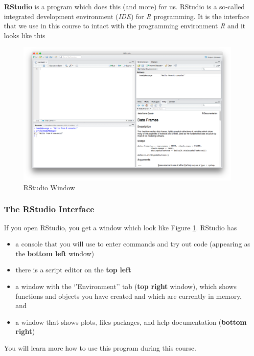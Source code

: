 \documentclass[
]{scrartcl}
\providecommand{\tightlist}{%
  \setlength{\itemsep}{0pt}\setlength{\parskip}{0pt}}
\begin{document}
\textbf{RStudio} is a program which does this (and more) for us. RStudio is a so-called integrated development environment (\emph{IDE}) for \emph{R} programming. It is the interface that we use in this course to intact with the programming environment \emph{R} and it looks like this

\begin{figure}
\includegraphics[width=650px]{images/rstudio} \caption{RStudio Window}\label{fig:rstudio}
\end{figure}

\subsubsection{The RStudio Interface}\label{the-rstudio-interface}

If you open RStudio, you get a window which look like Figure \ref{fig:rstudio}. RStudio has

\begin{itemize}
\tightlist
\item
  a console that you will use to enter commands and try out code (appearing as the \textbf{bottom left} window)
\item
  there is a script editor on the \textbf{top left}
\item
  a window with the `'Environment'' tab (\textbf{top right} window), which shows functions and objects you have created and which are currently in memory, and
\item
  a window that shows plots, files packages, and help documentation (\textbf{bottom right})
\end{itemize}

You will learn more how to use this program during this course.
\end{document}
